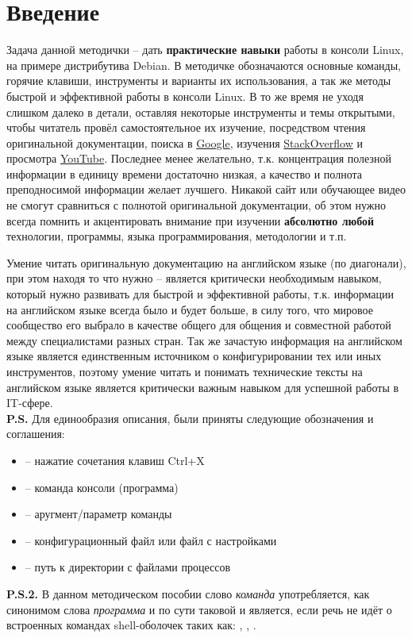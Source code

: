 \chapter{Введение}

Задача данной методички -- дать \textbf{практические навыки} работы в консоли Linux, на примере дистрибутива Debian. В методичке обозначаются основные команды, горячие клавиши, инструменты и варианты их использования, а так же методы быстрой и эффективной работы в консоли Linux. В то же время не уходя слишком далеко в детали, оставляя некоторые инструменты и темы открытыми, чтобы читатель провёл самостоятельное их изучение, посредством чтения оригинальной документации, поиска в \href{https://google.com}{Google}, изучения \href{https://stackoverflow.com}{StackOverflow} и просмотра \href{https://youtube.com}{YouTube}. Последнее менее желательно, т.к. концентрация полезной информации в единицу времени достаточно низкая, а качество и полнота преподносимой информации желает лучшего. Никакой сайт или обучающее видео не смогут сравниться с полнотой оригинальной документации, об этом нужно всегда помнить и акцентировать внимание при изучении \textbf{абсолютно любой} технологии, программы, языка программирования, методологии и т.п.

Умение читать оригинальную документацию на английском языке (по диагонали), при этом находя то что нужно -- является критически необходимым навыком, который нужно развивать для быстрой и эффективной работы, т.к. информации на английском языке всегда было и будет больше, в силу того, что мировое сообщество его выбрало в качестве общего для общения и совместной работой между специалистами разных стран. Так же зачастую информация на английском языке является единственным источником о конфигурировании тех или иных инструментов, поэтому умение читать и понимать технические тексты на английском языке является критически важным навыком для успешной работы в IT-сфере.
\\

\noindent \textbf{P.S.} Для единообразия описания, были приняты следующие обозначения и соглашения:

\begin{itemize}
	\item {} -- нажатие сочетания клавиш Ctrl+X
	\item {} -- команда консоли (программа)
	\item {} -- аругмент/параметр команды
	\item {} -- конфигурационный файл или файл с настройками
	\item {} -- путь к директории с файлами процессов
\end{itemize}

\noindent  \textbf{P.S.2.} В данном методическом пособии слово \textit{команда} употребляется, как синонимом слова \textit{программа} и по сути таковой и является, если речь не идёт о встроенных командах shell-оболочек таких как: , , .